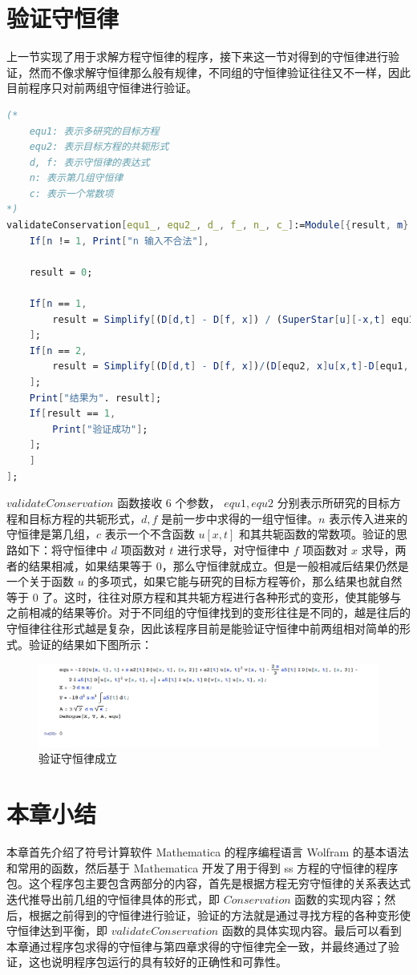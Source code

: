 \section{验证守恒律}
上一节实现了用于求解方程守恒律的程序，接下来这一节对得到的守恒律进行验证，然而不像求解守恒律那么般有规律，不同组的守恒律验证往往又不一样，因此目前程序只对前两组守恒律进行验证。

\begin{lstlisting}[language=Mathematica,caption=验证守恒律]
(*
	equ1: 表示多研究的目标方程
	equ2: 表示目标方程的共轭形式
	d, f: 表示守恒律的表达式
	n: 表示第几组守恒律
	c: 表示一个常数项
*)
validateConservation[equ1_, equ2_, d_, f_, n_, c_]:=Module[{result, m},
	If[n != 1, Print["n 输入不合法"],
	
	result = 0;

	If[n == 1,
		result = Simplify[(D[d,t] - D[f, x]) / (SuperStar[u][-x,t] equ1 - u[x,t] equ2) / c];
	];
	If[n == 2,
		result = Simplify[(D[d,t] - D[f, x])/(D[equ2, x]u[x,t]-D[equ1, x]SuperStar[u][-x,t] + D[SuperStar[u][-x,t],x]equ1 + D[u[x,t],x] equ2) / c];
	];
	Print["结果为". result];
	If[result == 1,
		Print["验证成功"];
	];
	]
];
\end{lstlisting}
$validateConservation$ 函数接收 6 个参数， $equ1, equ2$ 分别表示所研究的目标方程和目标方程的共轭形式，$d, f$ 是前一步中求得的一组守恒律。$n$ 表示传入进来的守恒律是第几组，$c$ 表示一个不含函数 $u[x,t]$ 和其共轭函数的常数项。验证的思路如下：将守恒律中 $d$ 项函数对 $t$ 进行求导，对守恒律中 $f$ 项函数对 $x$ 求导，两者的结果相减，如果结果等于 0，那么守恒律就成立。但是一般相减后结果仍然是一个关于函数 $u$ 的多项式，如果它能与研究的目标方程等价，那么结果也就自然等于 0 了。这时，往往对原方程和其共轭方程进行各种形式的变形，使其能够与之前相减的结果等价。对于不同组的守恒律找到的变形往往是不同的，越是往后的守恒律往往形式越是复杂，因此该程序目前是能验证守恒律中前两组相对简单的形式。验证的结果如下图所示：
\begin{figure}[!htp]
	\centering
	\includegraphics[width=\linewidth]{rogueResult.jpg}
	\caption{验证守恒律成立}
	\label{}
\end{figure}

\section{本章小结}
本章首先介绍了符号计算软件 Mathematica 的程序编程语言 Wolfram 的基本语法和常用的函数，然后基于 Mathematica 开发了用于得到 ss 方程的守恒律的程序包。这个程序包主要包含两部分的内容，首先是根据方程无穷守恒律的关系表达式迭代推导出前几组的守恒律具体的形式，即 $Conservation$ 函数的实现内容；然后，根据之前得到的守恒律进行验证，验证的方法就是通过寻找方程的各种变形使守恒律达到平衡，即 $validateConservation$ 函数的具体实现内容。最后可以看到本章通过程序包求得的守恒律与第四章求得的守恒律完全一致，并最终通过了验证，这也说明程序包运行的具有较好的正确性和可靠性。


